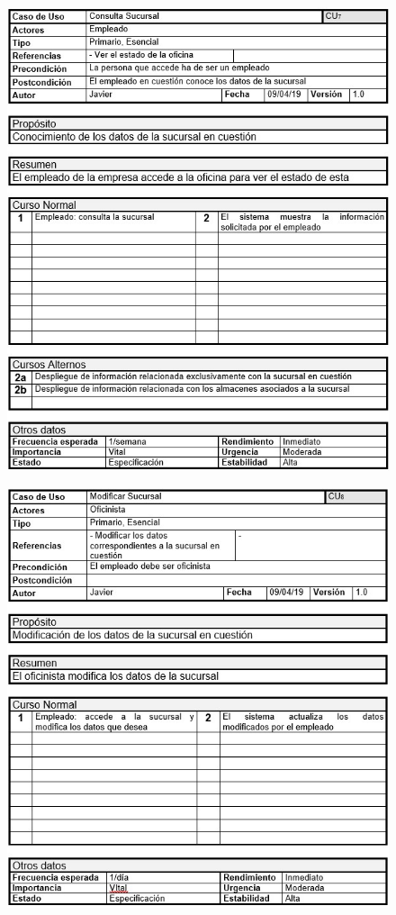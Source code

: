 \begin{figure}[H]
	\centering
	\includegraphics[width=16cm]{7j}
\end{figure}
\begin{figure}[H]
	\centering
	\includegraphics[width=16cm]{8j}
\end{figure}
